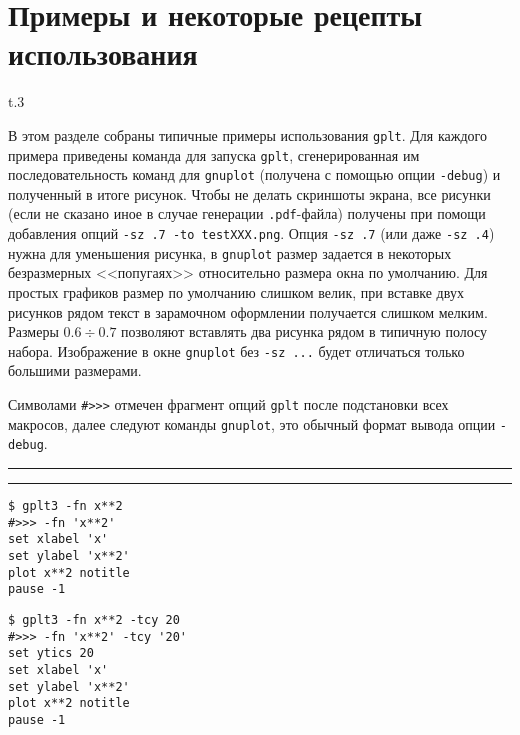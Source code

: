 \documentclass[12pt]{article}
\def\gplt{{\tt gplt}}
\def\gnuplot{{\tt gnuplot}}
\def\pdf{{\tt .pdf}}
\begin{document}
\section{Примеры и некоторые рецепты использования}
\begin{wrapfigure}[7]{t}{.3\textwidth}
  \vphantom{.}
  \vspace{-1cm}

\end{wrapfigure}
В этом разделе собраны типичные примеры использования \gplt.
Для каждого примера приведены команда для запуска \gplt, сгенерированная им последовательность команд
для \gnuplot{} (получена с помощью опции \verb'-debug') и полученный в итоге рисунок.
Чтобы не делать скриншоты экрана, все рисунки (если не сказано иное в случае генерации \pdf-файла) получены при помощи добавления
опций \verb'-sz .7 -to testXXX.png'. Опция \verb'-sz .7' (или даже \verb'-sz .4') нужна для уменьшения рисунка,
в \gnuplot{} размер задается в некоторых безразмерных <<попугаях>> относительно размера окна по умолчанию.
Для простых графиков размер по умолчанию слишком велик, при вставке двух рисунков рядом текст
в зарамочном оформлении получается слишком мелким. Размеры $0.6\div0.7$ позволяют вставлять два рисунка рядом в типичную полосу набора. 
Изображение в окне \gnuplot{} без \verb'-sz ...' будет отличаться только большими размерами.

Символами \verb'#>>>' отмечен фрагмент опций \gplt{} после подстановки всех макросов, далее следуют команды \gnuplot,
это обычный формат вывода опции \verb'-debug'.\\

\noindent\rule{.45\textwidth}{1pt}\hfill \raisebox{-.45\height}{\bf № 1.}  \hfill\rule{.45\textwidth}{1pt}

\vspace{3mm}
\noindent
\begin{minipage}[b]{0.19\textwidth}\small
\begin{verbatim}
$ gplt3 -fn x**2 
#>>> -fn 'x**2'
set xlabel 'x'
set ylabel 'x**2'
plot x**2 notitle   
pause -1
\end{verbatim}
\end{minipage}
\hfill
\begin{minipage}[b]{0.27\textwidth}\small
\begin{verbatim}
$ gplt3 -fn x**2 -tcy 20
#>>> -fn 'x**2' -tcy '20'
set ytics 20
set xlabel 'x'
set ylabel 'x**2'
plot x**2 notitle   
pause -1
\end{verbatim}
\end{minipage}
\end{document}
